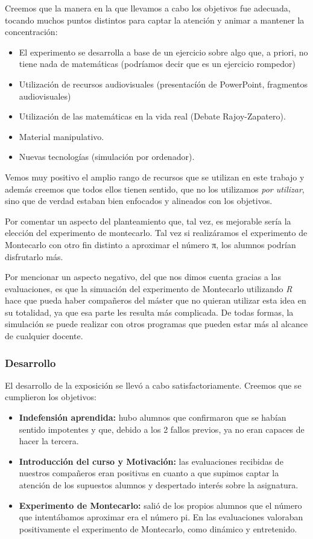 Creemos que la manera en la que llevamos a cabo los objetivos fue adecuada, tocando muchos puntos distintos para captar la atención y animar a mantener la concentración: 
\begin{itemize}
	\item El experimento se desarrolla a base de un ejercicio sobre algo que, a priori, no tiene nada de matemáticas (podríamos decir que es un ejercicio rompedor)
	\item Utilización de recursos audiovisuales (presentacíón de PowerPoint, fragmentos audiovisuales)
	\item Utilización de las matemáticas en la vida real (Debate Rajoy-Zapatero).
	\item Material manipulativo.
	\item Nuevas tecnologías (simulación por ordenador).
\end{itemize}

Vemos muy positivo el amplio rango de recursos que se utilizan en este trabajo y además creemos que todos ellos tienen sentido, que no los utilizamos \textit{por utilizar}, sino que de verdad estaban bien enfocados y alineados con los objetivos.

Por comentar un aspecto del planteamiento que, tal vez, es mejorable sería la elección del experimento de montecarlo.
%
Tal vez si realizáramos el experimento de Montecarlo con otro fin distinto a aproximar el número π, los alumnos podrían disfrutarlo más.

Por mencionar un aspecto negativo, del que nos dimos cuenta gracias a las evaluaciones, es que la simuación del experimento de Montecarlo utilizando \textit{R} hace que pueda haber compañeros del máster que no quieran utilizar esta idea en su totalidad, ya que esa parte les resulta más complicada.
%
De todas formas, la simulación se puede realizar con otros programas que pueden estar más al alcance de cualquier docente.

\subsubsection{Desarrollo}

El desarrollo de la exposición se llevó a cabo satisfactoriamente.
%
Creemos que se cumplieron los objetivos:
\begin{itemize}
	\item \textbf{Indefensión aprendida:} hubo alumnos que confirmaron que se habían sentido impotentes y que, debido a los 2 fallos previos, ya no eran capaces de hacer la tercera.
	\item \textbf{Introducción del curso y Motivación:} las evaluaciones recibidas de nuestros compañeros eran positivas en cuanto a que supimos captar la atención de los supuestos alumnos y despertado interés sobre la asignatura.
	\item \textbf{Experimento de Montecarlo:} salió de los propios alumnos que el número que intentábamos aproximar era el número pi.
	En las evaluaciones valoraban positivamente el experimento de Montecarlo, como dinámico y entretenido.
\end{itemize}

